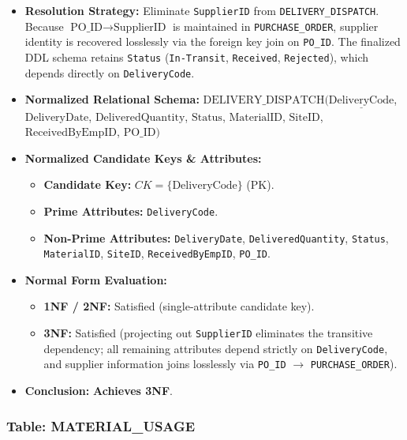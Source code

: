 \documentclass[a4paper,12pt]{report}
\begin{document}
\begin{itemize}
\item
  \textbf{Resolution Strategy:} Eliminate \texttt{SupplierID} from \texttt{DELIVERY\_\allowbreak{}DISPATCH}. Because \(\text{PO\_ID} \rightarrow \text{SupplierID}\) is maintained in \texttt{PURCHASE\_\allowbreak{}ORDER}, supplier identity is recovered losslessly via the foreign key join on \texttt{PO\_\allowbreak{}ID}. The finalized DDL schema retains \texttt{Status} (\texttt{In-Transit}, \texttt{Received}, \texttt{Rejected}), which depends directly on \texttt{DeliveryCode}.
\item
  \textbf{Normalized Relational Schema:} \(\text{DELIVERY\_DISPATCH}(\underline{\text{DeliveryCode}}\), \(\text{DeliveryDate}\), \(\text{DeliveredQuantity}\), \(\text{Status}\), \(\text{MaterialID}\), \(\text{SiteID}\), \(\text{ReceivedByEmpID}\), \(\text{PO\_ID})\)
\item
  \textbf{Normalized Candidate Keys \& Attributes:}

  \begin{itemize}
  \item
    \textbf{Candidate Key:} \(CK = \{\text{DeliveryCode}\}\) (PK).
  \item
    \textbf{Prime Attributes:} \texttt{DeliveryCode}.
  \item
    \textbf{Non-Prime Attributes:} \texttt{DeliveryDate}, \texttt{DeliveredQuantity}, \texttt{Status}, \texttt{MaterialID}, \texttt{SiteID}, \texttt{ReceivedByEmpID}, \texttt{PO\_\allowbreak{}ID}.
  \end{itemize}
\item
  \textbf{Normal Form Evaluation:}

  \begin{itemize}
  \item
    \textbf{1NF / 2NF:} Satisfied (single-attribute candidate key).
  \item
    \textbf{3NF:} Satisfied (projecting out \texttt{SupplierID} eliminates the transitive dependency; all remaining attributes depend strictly on \texttt{DeliveryCode}, and supplier information joins losslessly via \texttt{PO\_\allowbreak{}ID} \(\rightarrow\) \texttt{PURCHASE\_\allowbreak{}ORDER}).
  \end{itemize}
\item
  \textbf{Conclusion:} \textbf{Achieves 3NF}.
\end{itemize}

\subsubsection{\texorpdfstring{Table: MATERIAL\_\allowbreak{}USAGE}{Table: MATERIALUSAGE}}\label{table-material_usage}
\end{document}
